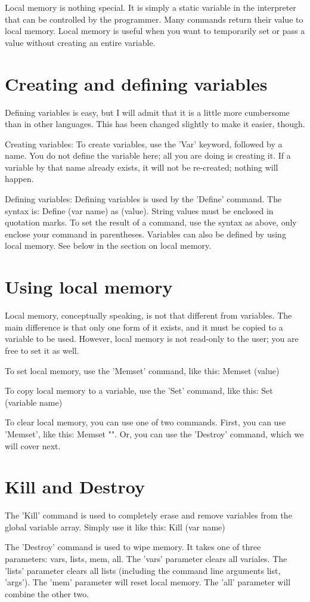 \documentclass{report}
\begin{document}
Local memory is nothing special. It is simply a static variable in the interpreter that can be controlled by the programmer. Many commands return their value to local memory. Local memory is useful when you want to temporarily set or pass a value without creating an entire variable.

\section{Creating and defining variables}

Defining variables is easy, but I will admit that it is a little more cumbersome than in other languages. This has been changed slightly to make it easier, though.

Creating variables: To create variables, use the 'Var' keyword, followed by a name. You do not define the variable here; all you are doing is creating it. If a variable by that name already exists, it will not be re-created; nothing will happen.

Defining variables: Defining variables is used by the 'Define' command. The syntax is: Define (var name) as (value). String values must be enclosed in quotation marks. To set the result of a command, use the syntax as above, only enclose your command in parentheses. Variables can also be defined by using local memory. See below in the section on local memory.

\section{Using local memory}

Local memory, conceptually speaking, is not that different from variables. The main difference is that only one form of it exists, and it must be copied to a variable to be used. However, local memory is not read-only to the user; you are free to set it as well.

To set local memory, use the 'Memset' command, like this: Memset (value)

To copy local memory to a variable, use the 'Set' command, like this: Set (variable name)

To clear local memory, you can use one of two commands. First, you can use 'Memset', like this: Memset "". Or, you can use the 'Destroy' command, which we will cover next.

\section{Kill and Destroy}

The 'Kill' command is used to completely erase and remove variables from the global variable array. Simply use it like this: Kill (var name)

The 'Destroy' command is used to wipe memory. It takes one of three parameters: vars, lists, mem, all. The 'vars' parameter clears all variales. The 'lists' parameter clears all lists (including the command line arguments list, 'args'). The 'mem' parameter will reset local memory. The 'all' parameter will combine the other two.
\end{document}
